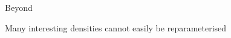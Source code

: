 \documentclass[14pt,dvipsnames]{beamer}
\begin{document}
\begin{frame}{Beyond}

	Many interesting densities cannot easily be reparameterised %
	
	~
	
\end{frame}
\end{document}
